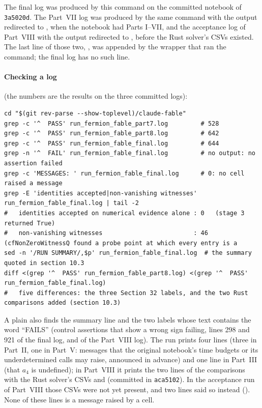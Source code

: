 The final log was produced by this command on the committed notebook of \texttt{3a5020d}. The
Part~VII log was produced by the same command with the output redirected to
, when the notebook had Parts I--VII, and the acceptance log of
Part~VIII with the output redirected to , before the Rust solver's
CSVs existed. The last line of those two, , was appended by the wrapper that ran the
command; the final log has no such line.

\paragraph{Checking a log} (the numbers are the results on the three committed logs):

\begin{Verbatim}[fontsize=\small]
cd "$(git rev-parse --show-toplevel)/claude-fable"
grep -c '^  PASS' run_fermion_fable_part7.log         # 528
grep -c '^  PASS' run_fermion_fable_part8.log         # 642
grep -c '^  PASS' run_fermion_fable_final.log         # 644
grep -n '^  FAIL' run_fermion_fable_final.log         # no output: no assertion failed
grep -c 'MESSAGES: ' run_fermion_fable_final.log      # 0: no cell raised a message
grep -E 'identities accepted|non-vanishing witnesses' run_fermion_fable_final.log | tail -2
#   identities accepted on numerical evidence alone : 0   (stage 3 returned True)
#   non-vanishing witnesses                         : 46   (cfNonZeroWitnessQ found a probe point at which every entry is a
sed -n '/RUN SUMMARY/,$p' run_fermion_fable_final.log  # the summary quoted in section 10.3
diff <(grep '^  PASS' run_fermion_fable_part8.log) <(grep '^  PASS' run_fermion_fable_final.log)
#   five differences: the three Section 32 labels, and the two Rust comparisons added (section 10.3)
\end{Verbatim}

A plain  also finds the summary line  and the two
 labels whose text contains the word ``FAILS'' (control assertions that show a wrong
sign failing, lines 298 and 921 of the final log, and of the Part~VIII log). The run prints four
 lines (three in Part~II, one in Part~V: messages that the original
notebook's time budgets or its underdetermined  calls may raise, announced in advance)
and one  line in Part~III (that $a_4$ is undefined); in Part~VIII it prints the two lines
 of the comparisons with the Rust solver's CSVs
 and  (committed in
\texttt{aca5102}). In the acceptance run of Part~VIII those CSVs were not yet present, and two
 lines said so instead ().
None of these lines is a message raised by a cell.

